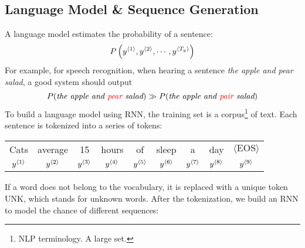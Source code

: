 \subsection{Language Model \& Sequence Generation}
A language model estimates the probability of a sentence:
\[P\left(y^{\left\langle 1\right\rangle},y^{\left\langle 2\right\rangle},\cdots, y^{\left\langle T_y\right\rangle}\right)\]
For example, for speech recognition, when hearing a sentence \textit{the apple and pear salad}, a good system should output 
\[P(\textit{the apple and {\color{red}pear} salad})\gg P(\textit{the apple and {\color{red}pair} salad})\]
To build a language model using RNN, the training set is a corpus\footnote{NLP terminology. A large set.} of text. Each sentence is tokenized into a series of tokens:
\begin{center}
  \begin{tabular}{ccccccccc}
    Cats & average & 15 & hours & of & sleep & a & day & $\langle\text{EOS}\rangle$\footnotemark\\
    $y^{\left\langle 1\right\rangle}$ & $y^{\left\langle 2\right\rangle}$ & $y^{\left\langle 3\right\rangle}$ & $y^{\left\langle 4\right\rangle}$ & $y^{\left\langle 5\right\rangle}$ & $y^{\left\langle 6\right\rangle}$ & $y^{\left\langle 7\right\rangle}$ & $y^{\left\langle 8\right\rangle}$ &  $y^{\left\langle 9\right\rangle}$\\
  \end{tabular}
\end{center}
If a word does not belong to the vocabulary, it is replaced with a unique token UNK, which stands for unknown words. After the tokenization, we build an RNN to model the chance of different sequences:
\begin{center}
\end{center}

